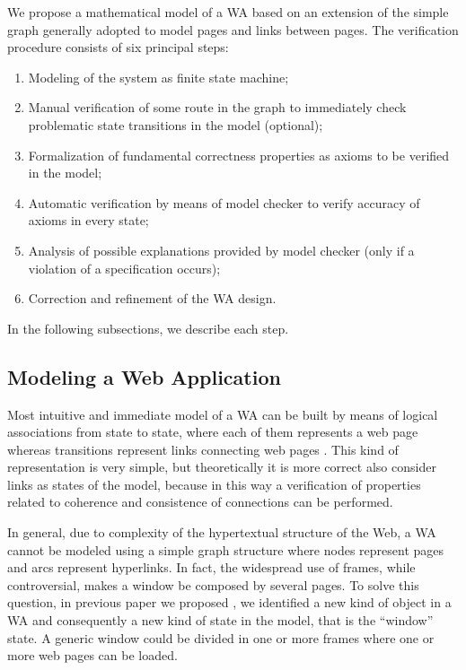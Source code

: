 We propose a mathematical model of a WA based on an extension of the simple graph generally adopted to model pages and links between pages. The verification procedure consists of six principal steps: 
\footnotesize
\begin{enumerate}
	\item Modeling of the system as finite state machine;
	\item Manual verification of some route in the graph to immediately check problematic state transitions in the model (optional);
	\item Formalization of fundamental correctness properties as \ctl axioms to be verified in the model;
	\item Automatic verification by means of model checker to verify accuracy of \ctl axioms in every state;
	\item Analysis of possible explanations provided by model checker (only if a violation of a specification occurs);
	\item Correction and refinement of the WA design.
\end{enumerate}

\normalsize
In the following subsections, we describe each step.



\subsection{Modeling a Web Application}
Most intuitive and immediate model of a WA can be built by means of logical associations from state to state, where each of them represents a web page whereas transitions represent links connecting web pages \cite{de-alfaro-01}. This kind of representation is very simple, but theoretically it is more correct also consider links as states of the model, because in this way a verification of properties related to coherence and consistence of connections can be performed.

In general, due to complexity of the hypertextual structure of the Web, a WA cannot be modeled using a simple graph structure where nodes represent pages and arcs represent hyperlinks. In fact, the widespread use of frames, while controversial, makes a window be composed by several pages. To solve this question, in previous paper we proposed \cite{seke-02} \cite{csmr-03}, we identified a new kind of object in a WA and consequently a new kind of state in the model, that is the ``window'' state. A generic window could be divided in one or more frames where one or more web pages can be loaded.

